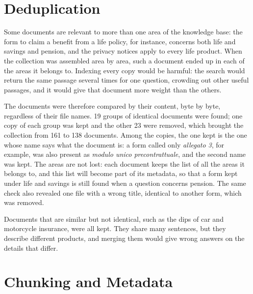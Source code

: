 \section{Deduplication}
\label{sec:deduplication}

Some documents are relevant to more than one area of the knowledge base: the form to claim a
benefit from a life policy, for instance, concerns both life and savings and pension, and the
privacy notices apply to every life product. When the collection was assembled area by area, such a
document ended up in each of the areas it belongs to. Indexing every copy would be harmful: the
search would return the same passage several times for one question, crowding out other useful
passages, and it would give that document more weight than the others.

The documents were therefore compared by their content, byte by byte, regardless of their file
names. 19 groups of identical documents were found; one copy of each group was kept and the other
23 were removed, which brought the collection from 161 to 138 documents. Among the copies, the one
kept is the one whose name says what the document is: a form called only \textit{allegato 3}, for
example, was also present as \textit{modulo unico precontrattuale}, and the second name was kept.
The areas are not lost: each document keeps the list of all the areas it belongs to, and this list
will become part of its metadata, so that a form kept under life and savings is still found when a
question concerns pension. The same check also revealed one file with a wrong title, identical to
another form, which was removed.

Documents that are similar but not identical, such as the \acp{dip} of car and motorcycle
insurance, were all kept. They share many sentences, but they describe different products, and
merging them would give wrong answers on the details that differ.

\section{Chunking and Metadata}
\label{sec:chunking}

